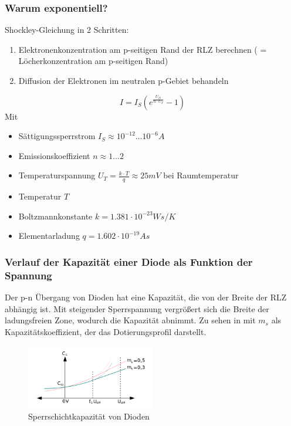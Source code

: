     \subsubsection{Warum exponentiell?}
    Shockley-Gleichung in 2 Schritten:
    \begin{enumerate}
        \item Elektronenkonzentration am p-seitigen Rand der RLZ berechnen ( = L\"ocherkonzentration am p-seitigen Rand)
        \item Diffusion der Elektronen im neutralen p-Gebiet behandeln
    \end{enumerate}
    \begin{equation}
        I = I_S (e^{\frac{U_D}{n \cdot U_T}} - 1)
    \end{equation}
    Mit
    \begin{itemize}
        \item S\"attigungssperrstrom $I_S \approx 10^{-12} \ldots 10^{-6}A$
        \item Emissionskoeffizient $n \approx 1 \ldots 2$
        \item Temperaturspannung $U_T=\frac{k \cdot T}{q} \approx 25mV$ bei Raumtemperatur
        \item Temperatur $T$
        \item Boltzmannkonstante $k=1.381\cdot 10^{-23} Ws/K$
        \item Elementarladung $q = 1.602 \cdot 10^{-19}As$
    \end{itemize}
    \subsubsection{Verlauf der Kapazit\"at einer Diode als Funktion der Spannung}
    Der p-n \"Ubergang von Dioden hat eine Kapazit\"at, die von der Breite der RLZ abh\"angig ist. Mit steigender Sperrspannung vergr\"o{\ss}ert sich die Breite der ladungsfreien Zone, wodurch die Kapazit\"at abnimmt. Zu sehen in  mit $m_s$ als Kapazit\"atskoeffizient, der das Dotierungsprofil darstellt.
    \begin{figure}
        \centering
        \includegraphics[width=0.5\textwidth]{fig/diodenkapazitaet}
        \caption{Sperrschichtkapazit\"at von Dioden}
        \label{fig:diodenkapazitaet}
    \end{figure}
